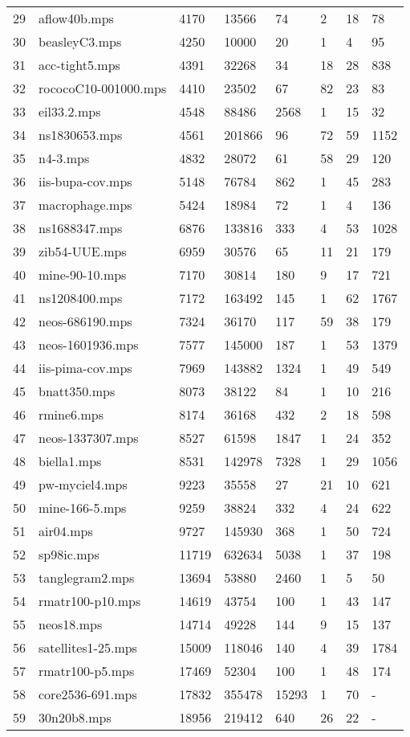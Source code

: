 \documentclass{article}
\begin{document}
\begin{longtable}{|l |l |l |l |l |l |l |l |}
29&aflow40b.mps&4170&13566&74&2&18&78\\
30&beasleyC3.mps&4250&10000&20&1&4&95\\
31&acc-tight5.mps&4391&32268&34&18&28&838\\
32&rococoC10-001000.mps&4410&23502&67&82&23&83\\
33&eil33.2.mps&4548&88486&2568&1&15&32\\
34&ns1830653.mps&4561&201866&96&72&59&1152\\
35&n4-3.mps&4832&28072&61&58&29&120\\
36&iis-bupa-cov.mps&5148&76784&862&1&45&283\\
37&macrophage.mps&5424&18984&72&1&4&136\\
38&ns1688347.mps&6876&133816&333&4&53&1028\\
39&zib54-UUE.mps&6959&30576&65&11&21&179\\
40&mine-90-10.mps&7170&30814&180&9&17&721\\
41&ns1208400.mps&7172&163492&145&1&62&1767\\
42&neos-686190.mps&7324&36170&117&59&38&179\\
43&neos-1601936.mps&7577&145000&187&1&53&1379\\
44&iis-pima-cov.mps&7969&143882&1324&1&49&549\\
45&bnatt350.mps&8073&38122&84&1&10&216\\
46&rmine6.mps&8174&36168&432&2&18&598\\
47&neos-1337307.mps&8527&61598&1847&1&24&352\\
48&biella1.mps&8531&142978&7328&1&29&1056\\
49&pw-myciel4.mps&9223&35558&27&21&10&621\\
50&mine-166-5.mps&9259&38824&332&4&24&622\\
51&air04.mps&9727&145930&368&1&50&724\\
52&sp98ic.mps&11719&632634&5038&1&37&198\\
53&tanglegram2.mps&13694&53880&2460&1&5&50\\
54&rmatr100-p10.mps&14619&43754&100&1&43&147\\
55&neos18.mps&14714&49228&144&9&15&137\\
56&satellites1-25.mps&15009&118046&140&4&39&1784\\
57&rmatr100-p5.mps&17469&52304&100&1&48&174\\
58&core2536-691.mps&17832&355478&15293&1&70&-\\
59&30n20b8.mps&18956&219412&640&26&22&-\\

\end{longtable}
\end{document}

